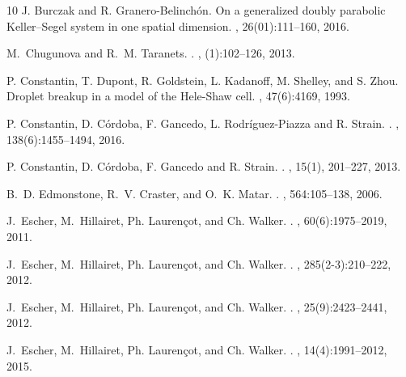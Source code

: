 \documentclass[reqno,11pt]{amsart}
\begin{document}
{\begin{thebibliography}{10}
J. Burczak and R. Granero-Belinch{\'o}n.
\newblock On a generalized doubly parabolic Keller--Segel system in one spatial
  dimension.
,
  26(01):111--160, 2016.

M.~Chugunova and R.~M. Taranets.
.
, (1):102--126, 2013.

P. Constantin, T. Dupont, R. Goldstein, L. Kadanoff, M. Shelley, and S. Zhou.
\newblock Droplet breakup in a model of the Hele-Shaw cell.
, 47(6):4169, 1993.

P. Constantin, D. Córdoba, F. Gancedo, L. Rodríguez-Piazza and R. Strain.
.
, 138(6):1455--1494, 2016.

P. Constantin, D. Córdoba, F. Gancedo and R. Strain.
.
, 15(1), 201--227, 2013.

B.~D. Edmonstone, R.~V. Craster, and O.~K. Matar.
.
, 564:105--138, 2006.

J.~Escher, M.~Hillairet, Ph. Lauren{\c{c}}ot, and Ch. Walker.
.
, 60(6):1975--2019, 2011.

J.~Escher, M.~Hillairet, Ph. Lauren{\c{c}}ot, and Ch. Walker.
.
, 285(2-3):210--222, 2012.

J.~Escher, M.~Hillairet, Ph. Lauren{\c{c}}ot, and Ch. Walker.
.
, 25(9):2423--2441, 2012.

J.~Escher, M.~Hillairet, Ph. Lauren{\c{c}}ot, and Ch. Walker.
.
, 14(4):1991--2012, 2015.


\end{thebibliography}}
\end{document}
